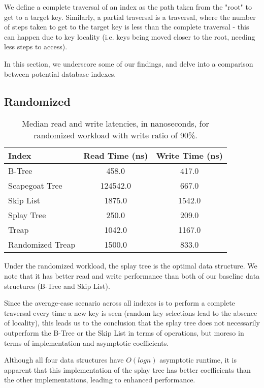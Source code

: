 \documentclass[sigconf]{acmart}
\begin{document}
We define a complete traversal of an index as the path taken from the "root" to get to a target  key. Similarly, a partial traversal is a traversal, where the number of steps taken to get to the target key is less than the complete traversal - this can happen due to key locality (i.e. keys being moved closer to the root, needing less steps to access).

In this section, we underscore some of our findings, and delve into a comparison between potential database indexes.

\subsection{Randomized}

\begin{center}
  \begin{table}[H]
    \begin{tabular}{|l|c|c|}
      \hline
      \bf{Index} & \bf{Read Time (ns)} & \bf{Write Time (ns)} \\
      \hline
      B-Tree&458.0&417.0\\
      \hline
      Scapegoat Tree&124542.0&667.0\\
      \hline
      Skip List&1875.0&1542.0\\
      \hline
      Splay Tree&250.0&209.0\\
      \hline
      Treap&1042.0&1167.0\\
      \hline
      Randomized Treap&1500.0&833.0\\
      \hline
    \end{tabular}
    \caption{Median read and write latencies, in nanoseconds, for randomized workload with write ratio of 90\%.}
  \end{table}
\end{center}

Under the randomized workload, the splay tree is the optimal data structure. We note that it has better read and write performance than both of our baseline data structures (B-Tree and Skip List). 

Since the average-case scenario across all indexes is to perform a complete traversal every time a new key is seen (random key selections lead to the absence of locality), this leads us to the conclusion that the splay tree does not necessarily outperform the B-Tree or the Skip List in terms of operations, but moreso in terms of implementation and asymptotic coefficients. 

Although all four data structures have $O(logn)$ asymptotic runtime, it is apparent that this implementation of the splay tree has better coefficients than the other implementations, leading to enhanced performance.
\end{document}
